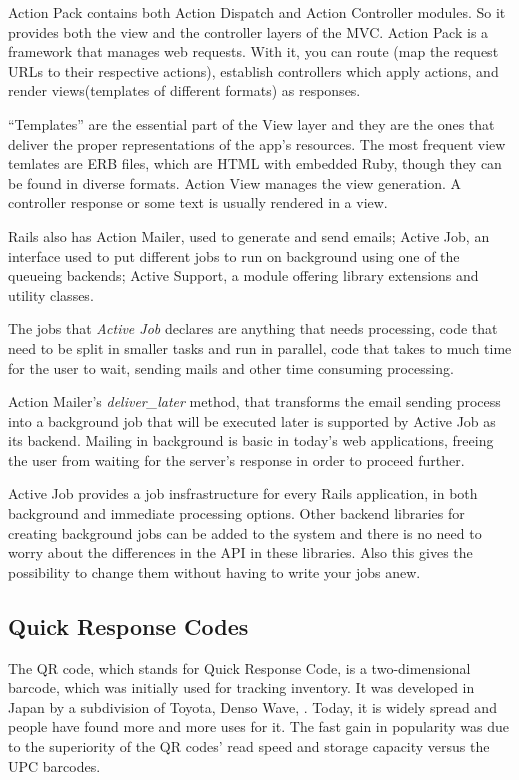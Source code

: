 Action Pack contains both Action Dispatch and Action Controller modules. So it provides both the view and the controller layers of the MVC. Action Pack is a framework that manages web requests. With it, you can route (map the request URLs to their respective actions), establish controllers which apply actions, and render views(templates of different formats) as responses.

``Templates'' are the essential part of the View layer and they are the ones that deliver the  proper representations of the app's resources. The most frequent view temlates are ERB files, which are HTML with embedded Ruby, though they can be found in diverse formats. Action View manages the view generation. A controller response or some text is usually rendered in a view.
 
Rails also has Action Mailer, used to generate and send emails; Active Job, an interface used to put different jobs to run on background using one of the queueing backends; Active Support, a module offering library extensions and utility classes.

The jobs that \textit{Active Job} declares are anything that needs processing, code that need to be split in smaller tasks and run in parallel, code that takes to much time for the user to wait, sending mails and other time consuming processing. 

Action Mailer's \textit{deliver\_later} method, that transforms the email sending process into a background job that will be executed later is supported by Active Job as its backend. Mailing in background is basic in today's web applications, freeing the user from waiting for the server's response in order to proceed further.
  
Active Job provides a job insfrastructure for every Rails application, in both background and immediate processing options. Other backend libraries for creating background jobs can be added to the system and there is no need to worry about the differences in the API in these libraries. Also this gives the possibility to change them without having to write your jobs anew.




\subsection{Quick Response Codes}
The QR code, which stands for Quick Response Code, is a two-dimensional barcode, which was initially used for tracking inventory. It was developed in Japan by a subdivision of Toyota, Denso Wave, \cite{qr_codes}. Today, it is widely spread and people have found more and more uses for it. The fast gain in popularity was due to the superiority of the QR codes’ read speed and storage capacity versus the UPC barcodes.

